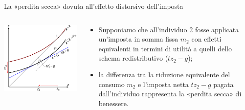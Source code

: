 \documentclass[aspectratio=64,12pt]{beamer}
\begin{document}
\begin{frame}{La «perdita secca» dovuta all'effetto distorsivo dell'imposta}
\begin{columns}[T]
\begin{column}{.55\columnwidth}
\begin{center}
\includegraphics[scale=.9]{./figure/effetto-distorsivo-imposte-ql-color-4.pdf}
\end{center}
\end{column}


\begin{column}{.45\columnwidth}
\begin{itemize}
\item Supponiamo che all'individuo 2 fosse applicata un'imposta in somma fissa
  $m_2$ con effetti equivalenti in termini di utilità a quelli dello schema
  redistributivo ($tz_2-g$);
\item la differenza tra la riduzione equivalente del consumo $m_2$ e l'imposta
  netta $tz_2-g$ pagata dall'individuo rappresenta la «perdita secca» di
  benessere.
\end{itemize}
\end{column}
\end{columns}
\end{frame}
\end{document}
